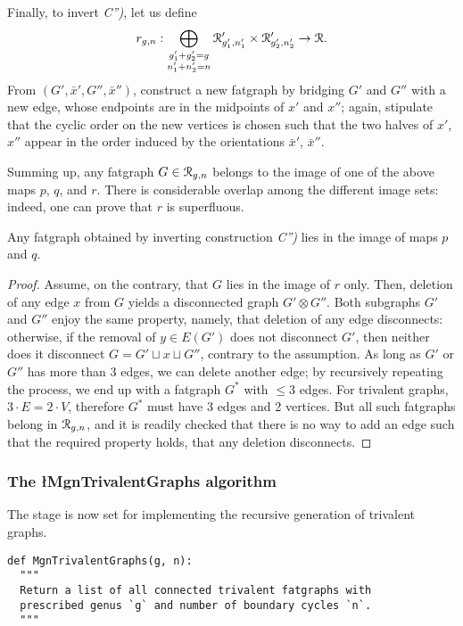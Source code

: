 Finally, to invert {\sl C'')}, let us define
\begin{equation*}
r_{g,n}: \bigoplus_{\substack{g'_1+g'_2=g \\ n'_1+n'_2=n}} 
\mathcal{R}'_{g'_1, n'_1} \times \mathcal{R}'_{g'_2, n'_2} \to \mathcal{R}.
\end{equation*}
From $(G', \bar{x}', G'',
\bar{x}'')$, construct a new fatgraph by bridging $G'$ and $G''$ with
a new edge, whose endpoints are in the midpoints of $x'$ and $x''$;
again, stipulate that the cyclic order on the new vertices is chosen
such that the two halves of $x'$, $x''$ appear in the order induced by
the orientations $\bar{x}'$, $\bar{x}''$.

Summing up, any fatgraph $G \in \mathcal{R}_{g,n}$ belongs to the image of one
of the above maps $p$, $q$, and $r$. There is considerable
overlap among the different image sets: indeed, one can prove that
$r$ is superfluous.
\begin{lemma}\label{lemma:no-c2}
  Any fatgraph obtained by inverting construction {\sl C'')} lies in
  the image of maps $p$ and $q$.
\end{lemma}
\begin{proof}
  Assume, on the contrary, that $G$ lies in the image of $r$ only.
  Then, deletion of any edge $x$ from $G$ yields a disconnected graph
  $G' \otimes G''$.  Both subgraphs $G'$ and $G''$ enjoy the same
  property, namely, that deletion of any edge disconnects: otherwise,
  if the removal of $y \in E(G')$ does not disconnect $G'$, then
  neither does it disconnect $G = G' \sqcup x \sqcup G''$, contrary to
  the assumption. As long as $G'$ or $G''$ has more than 3 edges, we
  can delete another edge; by recursively repeating the process, we
  end up with a fatgraph $G^*$ with $\leq 3$ edges.  For trivalent
  graphs, $3 \cdot E = 2 \cdot V$, therefore $G^*$ must have 3 edges
  and 2 vertices. But all such fatgraphs belong in $\mathcal{R}_{g,n}$, and it
  is readily checked that there is no way to add an edge such that the
  required property holds, that any deletion disconnects.
\end{proof}

\subsubsection{The \l{MgnTrivalentGraphs} algorithm}
\label{sec:MgnTrivalentGraphs}

The stage is now set for implementing the recursive generation of
trivalent graphs.
\begin{lstlisting}[name=MgnTrivalentGraphs,firstnumber=1]
def MgnTrivalentGraphs(g, n):
  """
  Return a list of all connected trivalent fatgraphs with
  prescribed genus `g` and number of boundary cycles `n`.
  """
\end{lstlisting}

